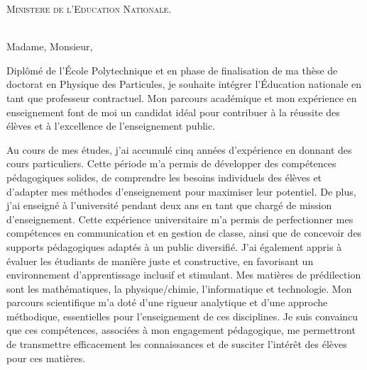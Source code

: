 \documentclass[10.7pt,a4paper]{lettre}
\begin{document}
\begin{letter} 
{\textsc{
    Ministere de l'Education Nationale.\\
} } %
\\
\address{M. \textsc{Benane} Gaya\\
171 Avenue de Luminy\\
Logement EF38\\
13~009~\textsc{Marseille}}  

\signature{ Gaya \textsc{Benane}}
\nofax
\date{\today}

{}
\opening{\hspace{1em} Madame, Monsieur,}
\hspace{1em}
Diplômé de l'École Polytechnique et en phase de finalisation de ma thèse de doctorat en Physique des Particules, je souhaite intégrer l'Éducation nationale en tant que professeur contractuel. Mon parcours académique et mon expérience en enseignement font de moi un candidat idéal pour contribuer à la réussite des élèves et à l’excellence de l’enseignement public.

\hspace{1em}
Au cours de mes études, j'ai accumulé cinq années d'expérience en donnant des cours particuliers. Cette période m'a permis de développer des compétences pédagogiques solides, de comprendre les besoins individuels des élèves et d'adapter mes méthodes d'enseignement pour maximiser leur potentiel.
De plus, j'ai enseigné à l'université pendant deux ans en tant que chargé de mission d'enseignement. Cette expérience universitaire m'a permis de perfectionner mes compétences en communication et en gestion de classe, ainsi que de concevoir des supports pédagogiques adaptés à un public diversifié. J'ai également appris à évaluer les étudiants de manière juste et constructive, en favorisant un environnement d'apprentissage inclusif et stimulant.
Mes matières de prédilection sont les mathématiques, la physique/chimie, l'informatique et technologie. Mon parcours scientifique
m'a doté d'une rigueur analytique et d'une approche méthodique, essentielles pour l'enseignement de ces disciplines. Je suis convaincu que ces compétences, associées à mon engagement pédagogique, me permettront de transmettre efficacement les connaissances et de susciter l'intérêt des élèves pour ces matières.


\end{letter}
\end{document}
